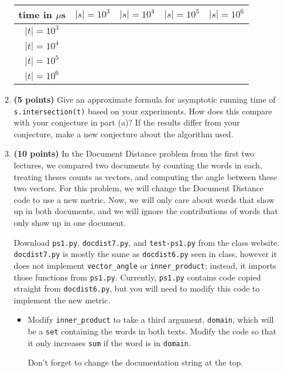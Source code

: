 \documentclass[12pt,twoside]{article}
\begin{document}
\begin{enumerate}
\begin{enumerate}
  \begin{tabular}{|c|c|c|c|c|}\hline
    time in $\mu$s & $|s|=10^3$ & $|s|=10^4$ & $|s|=10^5$ & $|s|=10^6$ \\ \hline
    $|t|=10^3$ & & & & \\ \hline
    $|t|=10^4$ & & & & \\ \hline
    $|t|=10^5$ & & & & \\ \hline
    $|t|=10^6$ & & & & \\ \hline
  \end{tabular}

  \item {\bf (5 points)} Give an approximate formula for asymptotic
    running time of \\ \texttt{s.intersection(t)} based on your
    experiments. How does this compare with your conjecture in part
    (a)? If the results differ from your conjecture, make a new
    conjecture about the algorithm used.

  \item {\bf (10 points)} In the Document Distance problem from the
    first two lectures, we compared two documents by counting the
    words in each, treating theses counts as vectors, and computing
    the angle between these two vectors. For this problem, we will
    change the Document Distance code to use a new metric. Now, we
    will only care about words that show up in both documents, and we
    will ignore the contributions of words that only show up in one
    document.

    Download \texttt{ps1.py}, \texttt{docdist7.py}, and
    \texttt{test-ps1.py} from the class website. \\ \texttt{docdist7.py}
    is mostly the same as \texttt{docdist6.py} seen in class, however
    it does not implement \texttt{vector\_angle} or
    \texttt{inner\_product}; instead, it imports those functions from
    \texttt{ps1.py}. Currently, \texttt{ps1.py} contains code copied
    straight from \texttt{docdist6.py}, but you will need to modify
    this code to implement the new metric.

    \begin{itemize}
    \item Modify \texttt{inner\_product} to take a third argument,
      \texttt{domain}, which will be a \texttt{set} containing the
      words in both texts. Modify the code so that it only increases
      \texttt{sum} if the word is in \texttt{domain}.

      Don't forget to change the documentation string at the top.


\end{itemize}
\end{enumerate}
\end{enumerate}
\end{document}
